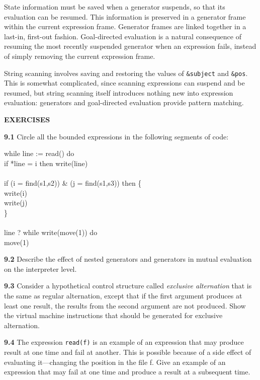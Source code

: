 State information must be saved when a generator suspends, so that its
evaluation can be resumed. This information is preserved in a
generator frame within the current expression frame. Generator frames
are linked together in a last-in, first-out fashion. Goal-directed
evaluation is a natural consequence of resuming the most recently
suspended generator when an expression fails, instead of simply
removing the current expression frame.

String scanning involves saving and restoring the values of
\texttt{\&subject} and \texttt{\&pos}. This is somewhat complicated,
since scanning expressions can suspend and be resumed, but string
scanning itself introduces nothing new into expression evaluation:
generators and goal-directed evaluation provide {\textquotedbl}pattern
matching.{\textquotedbl}

\bigskip

\noindent\textbf{EXERCISES}

\textbf{9.1} Circle all the bounded expressions in the following segments of code:

\begin{iconcode}
\>while line := read() do\\
\>\>if *line = i then write(line)\\
\\
\>if (i = find(s1,s2)) \& (j = find(s1,s3)) then \{\\
\>\>write(i)\\
\>\>write(j)\\
\>\>\}\\
\\
\>line ? while write(move(1)) do\\
\>\>\>move(1)
\end{iconcode}

\textbf{9.2} Describe the effect of nested generators and generators in mutual
evaluation on the interpreter level.

\textbf{9.3} Consider a hypothetical control structure called
\textit{exclusive alternation} that is the same as regular
alternation, except that if the first argument produces at least one
result, the results from the second argument are not produced. Show
the virtual machine instructions that should be generated for
exclusive alternation.

\textbf{9.4} The expression \texttt{read(f)} is an example of an expression
that may produce result at one time and fail at another. This is
possible because of a side effect of evaluating it---changing the
position in the file f. Give an example of an expression that may fail
at one time and produce a result at a subsequent time.

